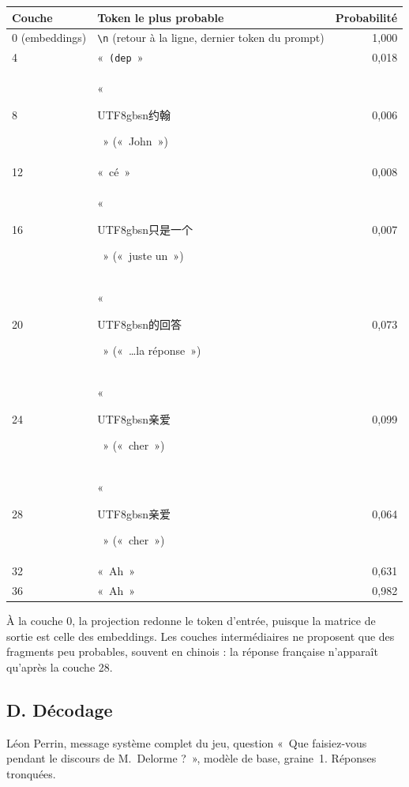 \documentclass[11pt,a4paper]{article}
\newcommand{\cjk}[1]{\begin{CJK*}{UTF8}{gbsn}#1\end{CJK*}}
\begin{document}
\begin{center}
\small
\begin{tabular}{@{}llr@{}}
\toprule
Couche & Token le plus probable & Probabilité \\
\midrule
0 (embeddings) & \texttt{\textbackslash n} (retour à la ligne, dernier token du prompt) & 1,000 \\
4 & «~\texttt{(dep}~» & 0,018 \\
8 & «~\cjk{约翰}~» («~John~») & 0,006 \\
12 & «~cé~» & 0,008 \\
16 & «~\cjk{只是一个}~» («~juste un~») & 0,007 \\
20 & «~\cjk{的回答}~» («~\ldots{}la réponse~») & 0,073 \\
24 & «~\cjk{亲爱}~» («~cher~») & 0,099 \\
28 & «~\cjk{亲爱}~» («~cher~») & 0,064 \\
32 & «~Ah~» & 0,631 \\
36 & «~Ah~» & 0,982 \\
\bottomrule
\end{tabular}
\end{center}

À la couche 0, la projection redonne le token d'entrée, puisque la matrice de sortie est celle des embeddings. Les couches intermédiaires ne proposent que des fragments peu probables, souvent en chinois : la réponse française n'apparaît qu'après la couche 28.

\subsection*{D. Décodage}

Léon Perrin, message système complet du jeu, question «~Que faisiez-vous pendant le discours de M.~Delorme ?~», modèle de base, graine~1. Réponses tronquées.
\end{document}
